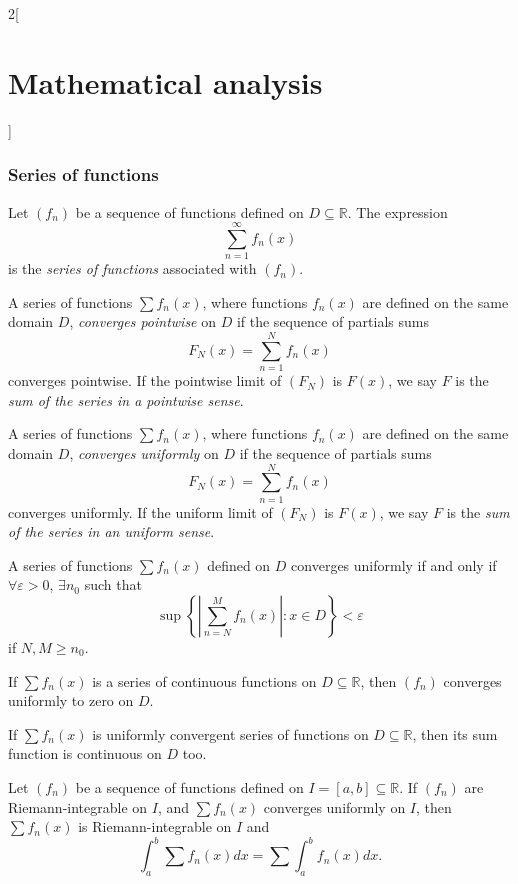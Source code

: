\documentclass[class=article,crop=false]{standalone}
\begin{document}
\begin{multicols}{2}[\section{Mathematical analysis}]
\subsubsection{Series of functions}
\begin{definition}
Let $(f_n)$ be a sequence of functions defined on $D\subseteq\mathbb{R}$. The expression $$\sum_{n=1}^\infty f_n(x)$$ is the \textit{series of functions} associated with $(f_n)$.
\end{definition}
\begin{definition}
A series of functions $\sum f_n(x)$, where functions $f_n(x)$ are defined on the same domain $D$, \textit{converges pointwise} on $D$ if the sequence of partials sums $$F_N(x)=\sum_{n=1}^Nf_n(x)$$ converges pointwise. If the pointwise limit of $(F_N)$ is $F(x)$, we say $F$ is the \textit{sum of the series in a pointwise sense}.
\end{definition}
\begin{definition}
A series of functions $\sum f_n(x)$, where functions $f_n(x)$ are defined on the same domain $D$, \textit{converges uniformly} on $D$ if the sequence of partials sums $$F_N(x)=\sum_{n=1}^Nf_n(x)$$ converges uniformly. If the uniform limit of $(F_N)$ is $F(x)$, we say $F$ is the \textit{sum of the series in an uniform sense}.
\end{definition}
\begin{theorem}
A series of functions $\sum f_n(x)$ defined on $D$ converges uniformly if and only if $\forall\varepsilon>0$, $\exists n_0$ such that $$\sup\left\{\left|\sum_{n=N}^Mf_n(x)\right|:x\in D\right\}< \varepsilon$$ if $N,M\geq n_0$.
\end{theorem}
\begin{corollary}
If $\sum f_n(x)$ is a series of continuous functions on $D\subseteq\mathbb{R}$, then $(f_n)$ converges uniformly to zero on $D$.
\end{corollary}
\begin{theorem}
If $\sum f_n(x)$ is uniformly convergent series of functions on $D\subseteq\mathbb{R}$, then its sum function is continuous on $D$ too.
\end{theorem}
\begin{theorem}
Let $(f_n)$ be a sequence of functions defined on $I=[a,b]\subseteq\mathbb{R}$. If $(f_n)$ are Riemann-integrable on $I$, and $\sum f_n(x)$ converges uniformly on $I$, then $\sum f_n(x)$ is Riemann-integrable on $I$ and $$\int_a^b\sum f_n(x) dx=\sum \int_a^bf_n(x) dx.$$
\end{theorem}

\end{multicols}
\end{document}
